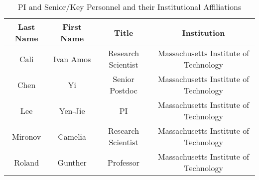 
\begin{table}[h]
\centering
 \caption{PI and Senior/Key Personnel and their Institutional Affiliations}
  \begin{tabular}{ | c | c | c | c | }
    \hline
    \textbf{Last Name} &  \textbf{First Name} &  \textbf{Title} & \textbf{Institution} \\ \hline
    Cali & Ivan Amos & Research Scientist &  Massachusetts Institute of Technology\\ \hline
    Chen & Yi & Senior Postdoc &  Massachusetts Institute of Technology\\ \hline
    Lee & Yen-Jie & PI &  Massachusetts Institute of Technology\\ \hline
    Mironov & Camelia & Research Scientist &  Massachusetts Institute of Technology\\ \hline
    Roland & Gunther & Professor &  Massachusetts Institute of Technology\\ \hline        
  \end{tabular}
\end{table}



